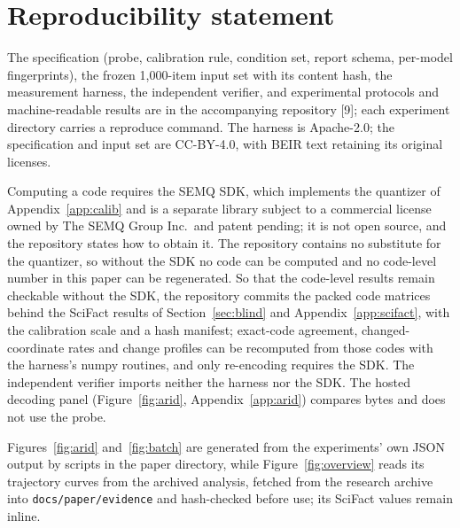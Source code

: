 \documentclass{article}
\begin{document}
\section*{Reproducibility statement}

The specification (probe, calibration rule, condition set, report schema, per-model fingerprints), the frozen 1{,}000-item input set with its content hash, the measurement harness, the independent verifier, and experimental protocols and machine-readable results are in the accompanying repository [9]; each experiment directory carries a reproduce command. The harness is Apache-2.0; the specification and input set are CC-BY-4.0, with BEIR text retaining its original licenses.

Computing a code requires the SEMQ SDK, which implements the quantizer of Appendix~\ref{app:calib} and is a separate library subject to a commercial license owned by The SEMQ Group Inc.\ and patent pending; it is not open source, and the repository states how to obtain it. The repository contains no substitute for the quantizer, so without the SDK no code can be computed and no code-level number in this paper can be regenerated. So that the code-level results remain checkable without the SDK, the repository commits the packed code matrices behind the SciFact results of Section~\ref{sec:blind} and Appendix~\ref{app:scifact}, with the calibration scale and a hash manifest; exact-code agreement, changed-coordinate rates and change profiles can be recomputed from those codes with the harness's numpy routines, and only re-encoding requires the SDK. The independent verifier imports neither the harness nor the SDK. The hosted decoding panel (Figure~\ref{fig:arid}, Appendix~\ref{app:arid}) compares bytes and does not use the probe.

Figures~\ref{fig:arid} and~\ref{fig:batch} are generated from the experiments' own JSON output by scripts in the paper directory, while Figure~\ref{fig:overview} reads its trajectory curves from the archived analysis, fetched from the research archive into \texttt{docs/paper/evidence} and hash-checked before use; its SciFact values remain inline.
\end{document}
